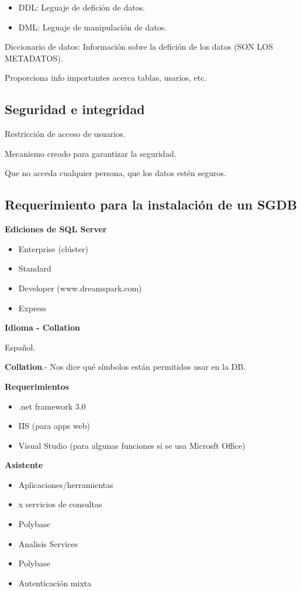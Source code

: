 \documentclass{article}
\begin{document}
\begin{itemize}
	\item
		DDL: Leguaje de defición de datos.
	\item
		DML: Leguaje de manipulación de datos.
\end{itemize}

Diccionario de datos: Información sobre la defición de los datos (SON LOS
METADATOS).

Proporciona info importantes acerca tablas, usarios, etc.

\subsection{Seguridad e integridad}

Restricción de acceso de usuarios.

Mecanismo creado para garantizar la seguridad.

Que no acceda cualquier persona, que los datos estén seguros.

\subsection{Requerimiento para la instalación de un SGDB}

\textbf{Ediciones de SQL Server}

\begin{itemize}
	\item
		Enterprise (clúster)
	\item
		Standard
	\item
		Developer (www.dreamspark.com)
	\item
		Express
\end{itemize}

\vspace{1em}
\textbf{Idioma - Collation}

Español.

\vspace{1em}
\textbf{Collation}.- Nos dice qué símbolos están permitidos usar en la DB.

\vspace{1em}
\textbf{Requerimientos}

\begin{itemize}
	\item
		.net framework 3.0
	\item
		IIS (para apps web)
	\item
		Visual Studio (para algunas funciones si se usa Microsft Office)
\end{itemize}

\vspace{1em}
\textbf{Asistente}

\begin{itemize}
	\item
		Aplicaciones/herramientas
	\item
		x servicios de consultas
	\item
		Polybase
	\item
		Analisis Services
	\item
		Polybase
	\item
		Autenticación mixta
\end{itemize}
\end{document}
